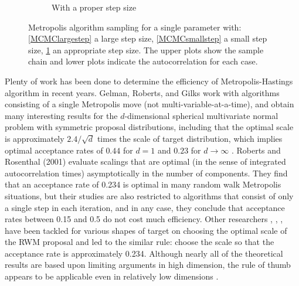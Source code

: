 \begin{figure}[h]
\begin{subfigure}[b]{0.32\textwidth}
    \caption{With a proper step size}\label{MCMCproperstep}
\end{subfigure}
\caption{Metropolis algorithm sampling for a single parameter with: \ref{MCMClargestep} a large step size, \ref{MCMCsmallstep} a small step size, \ref{MCMCproperstep} an appropriate step size. The upper plots show the sample chain and lower plots indicate the autocorrelation for each case.}
\label{largesmallstepsize}
\end{figure}


Plenty of work has been done to determine the efficiency of Metropolis-Hastings algorithm in recent years. Gelman, Roberts, and Gilks \cite{gelman1996efficient} work with algorithms consisting of a single Metropolis move (not multi-variable-at-a-time), and obtain many interesting results for the $d$-dimensional spherical multivariate normal problem with symmetric proposal distributions, including that the optimal scale is approximately $2.4/\sqrt{d}$ times the scale of target distribution, which implies optimal acceptance rates of $0.44$ for $d = 1$ and $0.23$ for $d\rightarrow \infty$ \cite{gilks1995markov}. Roberts and Rosenthal (2001) \cite{roberts2001optimal} evaluate scalings that are optimal (in the sense of integrated autocorrelation times) asymptotically in the number of components. They find that an acceptance rate of 0.234 is optimal in many random walk Metropolis situations, but their studies are also restricted to algorithms that consist of only a single step in each iteration, and in any case, they conclude that acceptance rates between 0.15 and 0.5 do not cost much efficiency. Other researchers \cite{roberts1997weak} \cite{bedard2007weak}, \cite{beskos2009optimal}, \cite{sherlock2009optimal}, \cite{sherlock2013optimal} have been tackled for various shapes of target on choosing the optimal scale of the RWM proposal and led to the similar rule: choose the scale so that the acceptance rate is approximately 0.234. Although nearly all of the theoretical results are based upon limiting arguments in high dimension, the rule of thumb appears to be applicable even in relatively low dimensions \cite{sherlock2010random}. 



